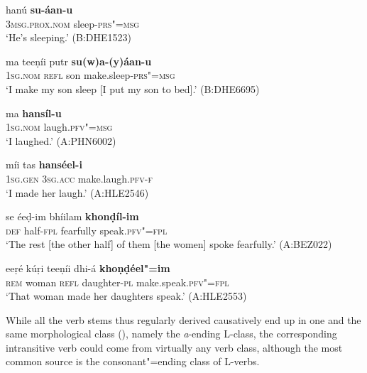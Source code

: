 \begin{exe}
\ex
\label{ex:8-7}
\gll hanú \textbf{su-áan-u} \\
\textsc{3msg.prox.nom} sleep-\textsc{prs"=msg} \\
\glt `He's sleeping.' (B:DHE1523)
\end{exe}
\begin{exe}
\ex
\label{ex:8-8}
\gll ma teeṇíi putr \textbf{su(w)a-(y)áan-u}  \\
\textsc{1sg.nom} \textsc{refl} son make.sleep-\textsc{prs"=msg} \\
\glt `I make my son sleep [I put my son to bed].' (B:DHE6695)
\end{exe}
\begin{exe}
\ex
\label{ex:8-9}
\gll ma \textbf{hansíl-u} \\
\textsc{1sg.nom} laugh.\textsc{pfv"=msg} \\
\glt `I laughed.' (A:PHN6002)
\end{exe}
\begin{exe}
\ex
\label{ex:8-10}
\gll míi tas \textbf{hanséel-i} \\
\textsc{1sg.gen} \textsc{3sg.acc} make.laugh.\textsc{pfv-f} \\
\glt `I made her laugh.' (A:HLE2546)
\end{exe}
\begin{exe}
\ex
\label{ex:8-11}
\gll se éeḍ-im bhíilam \textbf{khonḍíl-im} \\
\textsc{def} half-\textsc{fpl} fearfully speak.\textsc{pfv"=fpl} \\
\glt `The rest [the other half] of them [the women] spoke fearfully.' (A:BEZ022)
\end{exe}
\begin{exe}
\ex
\label{ex:8-12}
\gll eeṛé kúṛi teeṇíi dhi-á \textbf{khoṇḍéel"=im} \\
\textsc{rem} woman \textsc{refl} daughter-\textsc{pl} make.speak.\textsc{pfv"=fpl} \\
\glt `That woman made her daughters speak.' (A:HLE2553)
\end{exe}

While all the verb stems thus regularly derived causatively end up in one and the same morphological class (), namely the \textit{a}-ending L-class, the corresponding intransitive verb could come from virtually any verb class, although the most common source is the consonant"=ending class of L-verbs.



